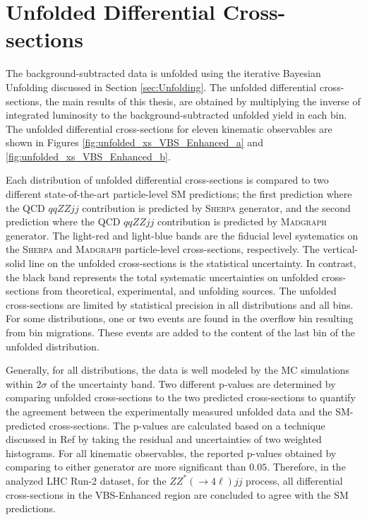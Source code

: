 \section{ Unfolded Differential Cross-sections }
\label{sec:DifferentialxS}

The background-subtracted data is unfolded using the iterative Bayesian Unfolding discussed in Section \ref{sec:Unfolding}. The unfolded differential cross-sections, the main results of this thesis, are obtained by multiplying the inverse of integrated luminosity to the background-subtracted unfolded yield in each bin. The unfolded differential cross-sections for eleven kinematic observables are shown in Figures \ref{fig:unfolded_xs_VBS_Enhanced_a} and \ref{fig:unfolded_xs_VBS_Enhanced_b}. 

Each distribution of unfolded differential cross-sections is compared to two different state-of-the-art particle-level SM predictions; the first prediction where the QCD $qqZZjj$ contribution is predicted by \textsc{Sherpa} generator, and the second prediction where the QCD $qqZZjj$ contribution is predicted by \textsc{Madgraph} generator. The light-red and light-blue bands are the fiducial level systematics on the \textsc{Sherpa} and \textsc{Madgraph} particle-level cross-sections, respectively. The vertical-solid line on the unfolded cross-sections is the statistical uncertainty. In contrast, the black band represents the total systematic uncertainties on unfolded cross-sections from theoretical, experimental, and unfolding sources. The unfolded cross-sections are limited by statistical precision in all distributions and all bins. For some distributions, one or two events are found in the overflow bin resulting from bin migrations. These events are added to the content of the last bin of the unfolded distribution. 

Generally, for all distributions, the data is well modeled by the MC simulations within $2\sigma$ of the uncertainty band. Two different p-values are determined by comparing unfolded cross-sections to the two predicted cross-sections to quantify the agreement between the experimentally measured unfolded data and the SM-predicted cross-sections. The p-values are calculated based on a technique discussed in Ref\cite{pValueStat} by taking the residual and uncertainties of two weighted histograms. For all kinematic observables, the reported p-values obtained by comparing to either generator are more significant than $0.05$. Therefore, in the analyzed LHC Run-2 dataset, for the $ZZ^*(\rightarrow 4 \ell) jj$ process, all differential cross-sections in the VBS-Enhanced region are concluded to agree with the SM predictions. 

